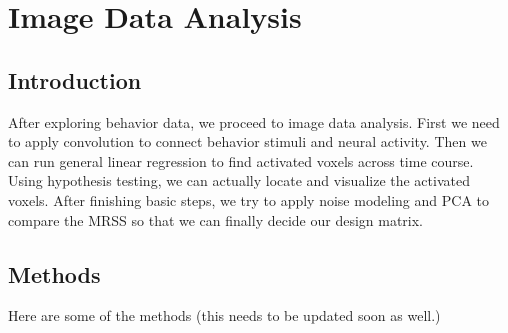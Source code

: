 \section{Image Data Analysis}
\subsection{Introduction}
\noindent
After exploring behavior data, we proceed to image data analysis.  First we need to apply convolution to connect behavior stimuli and neural activity. Then we can run general linear regression to find activated voxels across time course. Using hypothesis testing, we can actually locate and visualize the activated voxels. After finishing basic steps, we try to apply noise modeling and PCA to compare the MRSS so that we can finally decide our design matrix.

\subsection{Methods}
Here are some of the methods (this needs to be updated soon as well.)

